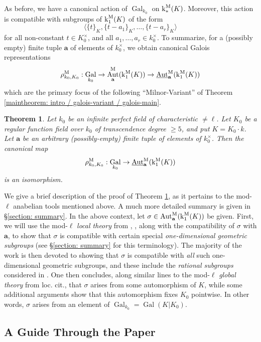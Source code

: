 \documentclass[11pt]{amsart}
\newtheorem{maintheorem}{Theorem}
\theoremstyle{definition}
\theoremstyle{remark}
\numberwithin{equation}{section}
\DeclareMathOperator{\Aut}{Aut}
\DeclareMathOperator{\Gal}{Gal}
\newcommand{\abf}{\mathbf{a}}
\newcommand{\Autm}{\Aut^{\rm M}}
\newcommand{\UAutm}{\underline{\Aut}^{\rm M}}
\renewcommand{\k}{\operatorname{k}^{\rm M}}
\newcommand{\Galk}{{\Gal_{k_0}}}
\begin{document}
As before, we have a canonical action of $\Galk$ on $\k_*(K)$.
Moreover, this action is compatible with subgroups of $\k_1(K)$ of the form 
\[ \langle \{t\}_K,\{t-a_1\}_K,\ldots,\{t-a_r\}_K \rangle \]
for all non-constant $t \in K_0^\times$, and all $a_1,\ldots,a_r \in k_0^\times$.
To summarize, for a (possibly empty) finite tuple $\abf$ of elements of $k_0^\times$, we obtain canonical Galois representations
\[ \rho^{\rm M}_{k_0,K_0} : \Galk \rightarrow \Autm_\abf(\k_1(K)) \rightarrow \UAutm_\abf(\k_1(K)) \]
which are the primary focus of the following ``Milnor-Variant'' of Theorem \ref{maintheorem: intro / galois-variant / galois-main}.

\begin{maintheorem}
\label{maintheorem: intro / milnor-variant / milnor-main}
  Let $k_0$ be an infinite perfect field of characteristic $\neq \ell$.
  Let $K_0$ be a regular function field over $k_0$ of transcendence degree $\geq 5$, and put $K = K_0 \cdot k$.
  Let $\abf$ be an arbitrary (possibly-empty) finite tuple of elements of $k_0^\times$.
  Then the canonical map
  \[ \rho^{\rm M}_{k_0,K_0} : \Galk \rightarrow \UAutm_\abf(\k_1(K)) \]
  is an isomorphism.
\end{maintheorem}

We give a brief description of the proof of Theorem \ref{maintheorem: intro / milnor-variant / milnor-main}, as it pertains to the mod-$\ell$ anabelian tools mentioned above.
A much more detailed summary is given in \S\ref{section: summary}.
In the above context, let $\sigma \in \Autm_\abf(\k_1(K))$ be given.
First, we will use the mod-$\ell$ \emph{local theory} from \cite{Topaz:2015}, \cite{Topaz:2013a}, along with the compatibility of $\sigma$ with $\abf$, to show that $\sigma$ is compatible with certain special \emph{one-dimensional geometric subgroups} (see \S\ref{section: summary} for this terminology).
The majority of the work is then devoted to showing that $\sigma$ is compatible with \emph{all} such one-dimensional geometric subgroups, and these include the \emph{rational subgroups} considered in \cite{Topaz:2014}.
One then concludes, along similar lines to the mod-$\ell$ \emph{global theory} from loc. cit., that $\sigma$ arises from some automorphism of $K$, while some additional arguments show that this automorphism fixes $K_0$ pointwise.
In other words, $\sigma$ arises from an element of $\Gal_{k_0} = \Gal(K|K_0)$.

\subsection{A Guide Through the Paper}
\label{subsection: guide}
\end{document}
